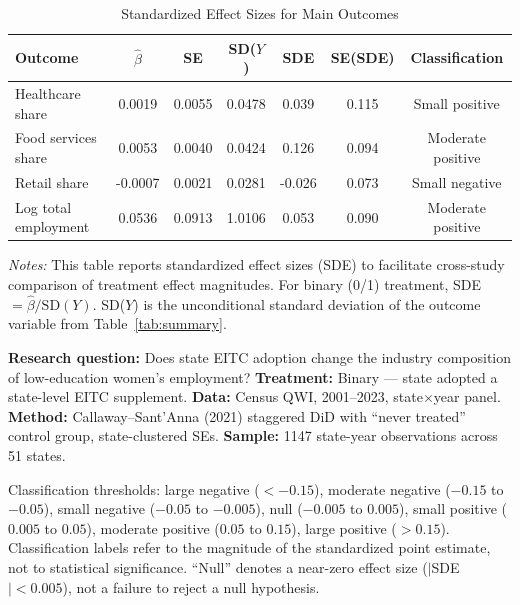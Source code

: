 \begin{table}[H]
\centering
\caption{Standardized Effect Sizes for Main Outcomes}
\label{tab:sde}
\begin{tabular}{lcccccc}
\toprule
Outcome & $\hat{\beta}$ & SE & SD($Y$) & SDE & SE(SDE) & Classification \\
\midrule
Healthcare share & 0.0019 & 0.0055 & 0.0478 & 0.039 & 0.115 & Small positive \\
Food services share & 0.0053 & 0.0040 & 0.0424 & 0.126 & 0.094 & Moderate positive \\
Retail share & -0.0007 & 0.0021 & 0.0281 & -0.026 & 0.073 & Small negative \\
Log total employment & 0.0536 & 0.0913 & 1.0106 & 0.053 & 0.090 & Moderate positive \\
\bottomrule
\end{tabular}
\par\vspace{0.3em}
{\footnotesize \emph{Notes:} This table reports standardized effect sizes (SDE) to facilitate cross-study comparison of treatment effect magnitudes. For binary (0/1) treatment, SDE $= \hat{\beta} / \text{SD}(Y)$. SD($Y$) is the unconditional standard deviation of the outcome variable from Table~\ref{tab:summary}.

\textbf{Research question:} Does state EITC adoption change the industry composition of low-education women's employment? \textbf{Treatment:} Binary --- state adopted a state-level EITC supplement. \textbf{Data:} Census QWI, 2001--2023, state$\times$year panel. \textbf{Method:} Callaway--Sant'Anna (2021) staggered DiD with ``never treated'' control group, state-clustered SEs. \textbf{Sample:} 1147 state-year observations across 51 states.

Classification thresholds: large negative ($< -0.15$), moderate negative ($-0.15$ to $-0.05$), small negative ($-0.05$ to $-0.005$), null ($-0.005$ to $0.005$), small positive ($0.005$ to $0.05$), moderate positive ($0.05$ to $0.15$), large positive ($> 0.15$). Classification labels refer to the magnitude of the standardized point estimate, not to statistical significance. ``Null'' denotes a near-zero effect size ($|$SDE$| < 0.005$), not a failure to reject a null hypothesis.}
\end{table}
